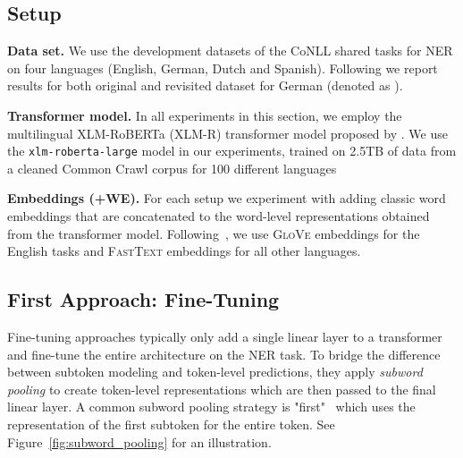\documentclass[11pt,a4paper]{article}
\begin{document}
\subsection{Setup}

\noindent
\textbf{Data set.} We use the development datasets of the CoNLL shared tasks \citep{tjong-kim-sang-de-meulder-2003-introduction,tjong-kim-sang-2002-introduction} for NER on four languages (English, German, Dutch and Spanish). Following \citet{yu-etal-2020-named} we report results for both original and revisited dataset for German (denoted as ).

\noindent
\textbf{Transformer model.}
In all experiments in this section, we employ the multilingual XLM-RoBERTa (XLM-R) transformer model proposed by \citet{conneau2019unsupervised}. We use the \texttt{xlm-roberta-large} model in our experiments, trained on 2.5TB of data from a cleaned Common Crawl corpus \cite{wenzek-etal-2020-ccnet} for 100 different languages



\noindent
\textbf{Embeddings (+WE).}
For each setup we experiment with adding classic word embeddings that are concatenated to the word-level representations obtained from the transformer model. Following~\citet{akbik-etal-2018-contextual}, we use \textsc{GloVe} embeddings \citep{pennington-etal-2014-glove} for the English tasks and \textsc{FastText} embeddings \citep{bojanowski-etal-2017-enriching} for all other languages.






\subsection{First Approach: Fine-Tuning}
\label{sec:fine_tuning}

Fine-tuning approaches typically only add a single linear layer to a transformer and fine-tune the entire architecture on the NER task. To bridge the difference between subtoken modeling and token-level predictions, they apply \textit{subword pooling} to create token-level representations which are then passed to the final linear layer. A common subword pooling strategy is "first"~\cite{devlin-etal-2019-bert} which uses the representation of the first subtoken for the entire token. See Figure~\ref{fig:subword_pooling} for an illustration. 
\end{document}
